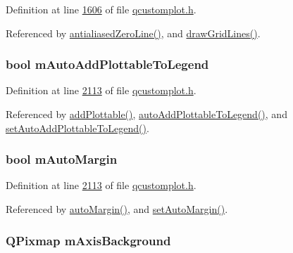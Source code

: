 Definition at line \hyperlink{a00116_source_l01606}{1606} of file \hyperlink{a00116_source}{qcustomplot.\+h}.



Referenced by \hyperlink{a00116_source_l01590}{antialiased\+Zero\+Line()}, and \hyperlink{a00115_source_l14260}{draw\+Grid\+Lines()}.

\hypertarget{a00116_ada47453c490f699c82bb400d749b2cf4}{
\subsubsection[{m\+Auto\+Add\+Plottable\+To\+Legend}]{\setlength{\rightskip}{0pt plus 5cm}bool m\+Auto\+Add\+Plottable\+To\+Legend}}\label{a00116_ada47453c490f699c82bb400d749b2cf4}


Definition at line \hyperlink{a00116_source_l02113}{2113} of file \hyperlink{a00116_source}{qcustomplot.\+h}.



Referenced by \hyperlink{a00115_source_l06487}{add\+Plottable()}, \hyperlink{a00116_source_l01971}{auto\+Add\+Plottable\+To\+Legend()}, and \hyperlink{a00115_source_l06209}{set\+Auto\+Add\+Plottable\+To\+Legend()}.

\hypertarget{a00116_a9f5c2927e8dd4f66342f80d3b332cd3f}{
\subsubsection[{m\+Auto\+Margin}]{\setlength{\rightskip}{0pt plus 5cm}bool m\+Auto\+Margin}}\label{a00116_a9f5c2927e8dd4f66342f80d3b332cd3f}


Definition at line \hyperlink{a00116_source_l02113}{2113} of file \hyperlink{a00116_source}{qcustomplot.\+h}.



Referenced by \hyperlink{a00116_source_l01962}{auto\+Margin()}, and \hyperlink{a00115_source_l05989}{set\+Auto\+Margin()}.

\hypertarget{a00116_ab93f80321dad937ebc6f2eaad1640c50}{
\subsubsection[{m\+Axis\+Background}]{\setlength{\rightskip}{0pt plus 5cm}Q\+Pixmap m\+Axis\+Background}}\label{a00116_ab93f80321dad937ebc6f2eaad1640c50}


